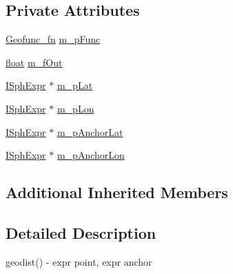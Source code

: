\subsection*{Private Attributes}
\begin{DoxyCompactItemize}
\item 
\hyperlink{sphinxexpr_8cpp_a162dd05806302c01435e9c554f017be4}{Geofunc\-\_\-fn} \hyperlink{classExpr__Geodist__c_aa4b14718e45ab55c336149ad038dafff}{m\-\_\-p\-Func}
\item 
\hyperlink{sphinxexpr_8cpp_a0e0d0739f7035f18f949c2db2c6759ec}{float} \hyperlink{classExpr__Geodist__c_a810e6193d8b3a750d0ca2cec60f9792e}{m\-\_\-f\-Out}
\item 
\hyperlink{structISphExpr}{I\-Sph\-Expr} $\ast$ \hyperlink{classExpr__Geodist__c_a3a2beae2806acc87e14c02c6b5e57105}{m\-\_\-p\-Lat}
\item 
\hyperlink{structISphExpr}{I\-Sph\-Expr} $\ast$ \hyperlink{classExpr__Geodist__c_a668b71adc439b6ad94597f2815a1aadb}{m\-\_\-p\-Lon}
\item 
\hyperlink{structISphExpr}{I\-Sph\-Expr} $\ast$ \hyperlink{classExpr__Geodist__c_a71879a98cfd0357f9d5a62f4c919c2b2}{m\-\_\-p\-Anchor\-Lat}
\item 
\hyperlink{structISphExpr}{I\-Sph\-Expr} $\ast$ \hyperlink{classExpr__Geodist__c_a4786e80a557334ea711f6756e370712e}{m\-\_\-p\-Anchor\-Lon}
\end{DoxyCompactItemize}
\subsection*{Additional Inherited Members}


\subsection{Detailed Description}
geodist() -\/ expr point, expr anchor 

